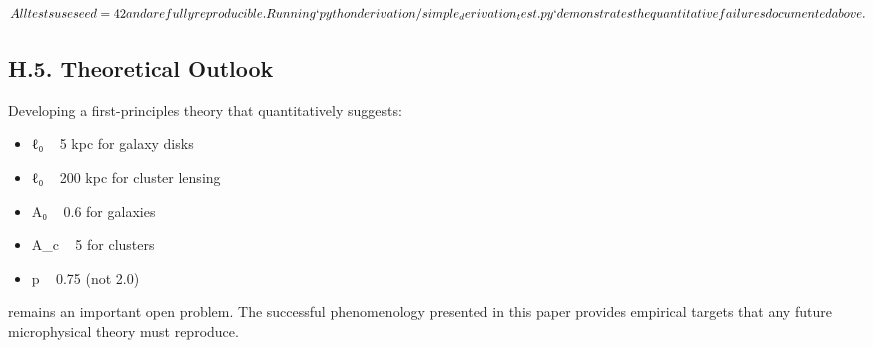 \documentclass[11pt,a4paper]{article}
\begin{document}
\[
All tests use seed=42 and are fully reproducible. Running `python derivation/simple_derivation_test.py` demonstrates the quantitative failures documented above.
\]


\subsection{H.5. Theoretical Outlook}


Developing a first-principles theory that quantitatively suggests:

\begin{itemize}
\item ℓ₀ ~ 5 kpc for galaxy disks
\item ℓ₀ ~ 200 kpc for cluster lensing
\item A₀ ~ 0.6 for galaxies
\item A\_c ~ 5 for clusters
\item p ~ 0.75 (not 2.0)
\end{itemize}


remains an important open problem. The successful phenomenology presented in this paper provides empirical targets that any future microphysical theory must reproduce.
\end{document}
